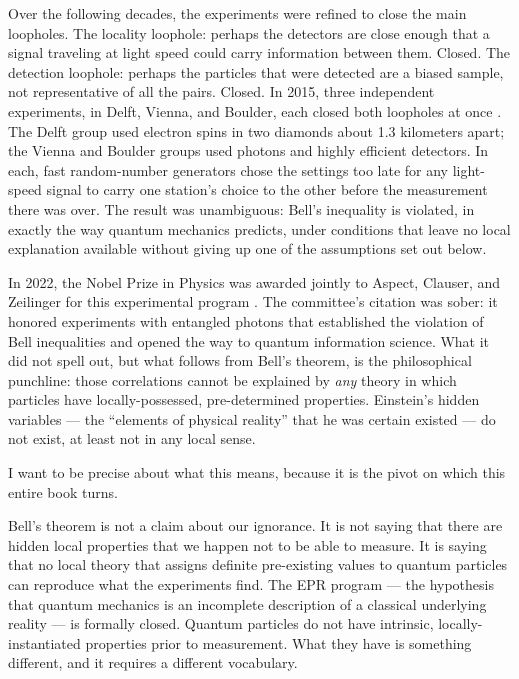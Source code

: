 Over the following decades, the experiments were refined to close the main loopholes. The locality loophole: perhaps the detectors are close enough that a signal traveling at light speed could carry information between them. Closed. The detection loophole: perhaps the particles that were detected are a biased sample, not representative of all the pairs. Closed. In 2015, three independent experiments, in Delft, Vienna, and Boulder, each closed both loopholes at once \citep[see][]{Zeilinger2023Nobel}. The Delft group used electron spins in two diamonds about 1.3 kilometers apart; the Vienna and Boulder groups used photons and highly efficient detectors. In each, fast random-number generators chose the settings too late for any light-speed signal to carry one station's choice to the other before the measurement there was over. The result was unambiguous: Bell's inequality is violated, in exactly the way quantum mechanics predicts, under conditions that leave no local explanation available without giving up one of the assumptions set out below.

In 2022, the Nobel Prize in Physics was awarded jointly to Aspect, Clauser, and Zeilinger for this experimental program \citep{Zeilinger2023Nobel}. The committee's citation was sober: it honored experiments with entangled photons that established the violation of Bell inequalities and opened the way to quantum information science. What it did not spell out, but what follows from Bell's theorem, is the philosophical punchline: those correlations cannot be explained by \emph{any} theory in which particles have locally-possessed, pre-determined properties. Einstein's hidden variables --- the ``elements of physical reality'' that he was certain existed --- do not exist, at least not in any local sense.

I want to be precise about what this means, because it is the pivot on which this entire book turns.

Bell's theorem is not a claim about our ignorance. It is not saying that there are hidden local properties that we happen not to be able to measure. It is saying that no local theory that assigns definite pre-existing values to quantum particles can reproduce what the experiments find. The EPR program --- the hypothesis that quantum mechanics is an incomplete description of a classical underlying reality --- is formally closed. Quantum particles do not have intrinsic, locally-instantiated properties prior to measurement. What they have is something different, and it requires a different vocabulary.

